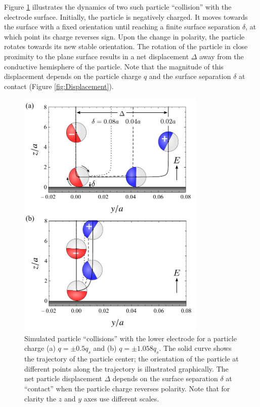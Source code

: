 \begin{appendices}
Figure \ref{fig:Collision} illustrates the dynamics of two such particle ``collision'' with the electrode surface. Initially, the particle is negatively charged.  It moves towards the surface with a fixed orientation until reaching a finite surface separation $\delta$, at which point its charge reverses sign. Upon the change in polarity, the particle  rotates towards its new stable orientation.  The rotation of the particle in close proximity to the plane surface results in a net displacement $\Delta$ away from the conductive hemisphere of the particle.  Note that the magnitude of this displacement depends on the particle charge $q$ and the surface separation $\delta$ at contact (Figure \ref{fig:Displacement}).

\begin{figure}[h]
    \centering
    \includegraphics[width=9cm]{figures/A1_Collision.pdf}
    \caption{ Simulated particle ``collisions'' with the lower electrode for a particle charge (a) $q=\pm0.5q_s$ and (b) $q=\pm1.058q_s$. The solid curve shows the trajectory of the particle center; the orientation of the particle at different points along the trajectory is illustrated graphically. The net particle displacement $\Delta$ depends on the surface separation $\delta$ at ``contact'' when the particle charge reverses polarity. Note that for clarity the $z$ and $y$ axes use different scales.}
    \label{fig:Collision}
\end{figure}


\end{appendices}
